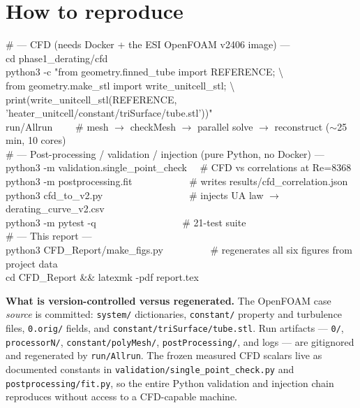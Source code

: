 \documentclass[11pt]{article}
\newcommand{\file}[1]{\texttt{\small #1}}
\begin{document}
\section{How to reproduce}

\begin{center}\begin{minipage}{0.95\linewidth}\ttfamily\footnotesize
\# --- CFD (needs Docker + the ESI OpenFOAM v2406 image) ---\\
cd phase1\_derating/cfd\\
python3 -c "from geometry.finned\_tube import REFERENCE; \textbackslash\\
\phantom{python3 -c "}from geometry.make\_stl import write\_unitcell\_stl; \textbackslash\\
\phantom{python3 -c "}print(write\_unitcell\_stl(REFERENCE, 'heater\_unitcell/constant/triSurface/tube.stl'))"\\
run/Allrun \ \ \ \ \# mesh $\rightarrow$ checkMesh $\rightarrow$ parallel solve $\rightarrow$ reconstruct ($\sim$25 min, 10 cores)\\[4pt]
\# --- Post-processing / validation / injection (pure Python, no Docker) ---\\
python3 -m validation.single\_point\_check \ \ \# CFD vs correlations at Re=8368\\
python3 -m postprocessing.fit \ \ \ \ \ \ \ \ \ \ \ \# writes results/cfd\_correlation.json\\
python3 cfd\_to\_v2.py \ \ \ \ \ \ \ \ \ \ \ \ \ \ \ \ \ \# injects UA law $\rightarrow$ derating\_curve\_v2.csv\\
python3 -m pytest -q \ \ \ \ \ \ \ \ \ \ \ \ \ \ \ \ \ \# 21-test suite\\[4pt]
\# --- This report ---\\
python3 CFD\_Report/make\_figs.py \ \ \ \ \ \ \ \ \ \# regenerates all six figures from project data\\
cd CFD\_Report \&\& latexmk -pdf report.tex
\end{minipage}\end{center}

\textbf{What is version-controlled versus regenerated.} The OpenFOAM case \emph{source} is committed:
\file{system/} dictionaries, \file{constant/} property and turbulence files, \file{0.orig/} fields, and
\file{constant/triSurface/tube.stl}. Run artifacts --- \file{0/}, \file{processorN/},
\file{constant/polyMesh/}, \file{postProcessing/}, and logs --- are gitignored and regenerated by
\file{run/Allrun}. The frozen measured CFD scalars live as documented constants in
\file{validation/single\_point\_check.py} and \file{postprocessing/fit.py}, so the entire Python
validation and injection chain reproduces without access to a CFD-capable machine.
\end{document}
